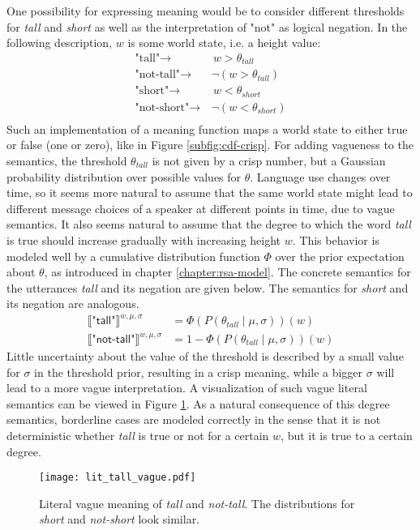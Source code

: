 One possibility for expressing meaning would be to consider different thresholds for \textit{tall} and \textit{short} as well as the interpretation of "not" as logical negation. In the following description, $w$ is some world state, i.e. a height value:
\begin{align*}
\text{"tall"} \rightarrow& \,\, w > \theta_{tall}\\ 
\text{"not-tall"} \rightarrow& \, \neg (w > \theta_{tall})\\
\text{"short"} \rightarrow& \,\, w < \theta_{short}\\
\text{"not-short"} \rightarrow& \, \neg (w < \theta_{short})\\
\end{align*}
Such an implementation of a meaning function maps a world state to either true or false (one or zero), like in Figure \ref{subfig:cdf-crisp}. For adding vagueness to the semantics, the threshold $\theta_{tall}$ is not given by a crisp number, but a Gaussian probability distribution over possible values for $\theta$. Language use changes over time, so it seems more natural to assume that the same world state might lead to different message choices of a speaker at different points in time, due to vague semantics. It also seems natural to assume that the degree to which the word \textit{tall} is true should increase gradually with increasing height $w$. This behavior is modeled well by a cumulative distribution function $\Phi$ over the prior expectation about $\theta$, as introduced in chapter \ref{chapter:rsa-model}. The concrete semantics for the utterances \textit{tall} and its negation are given below. The semantics for \textit{short} and its negation are analogous.
\begin{align*}
\llbracket \textsf{"tall"} \rrbracket^{w, \mu,\sigma} &= \Phi(P(\theta_{tall} \mid \mu, \sigma))(w)\\
\llbracket \textsf{"not-tall"}  \rrbracket^{w, \mu,\sigma} &= 1 - \Phi(P(\theta_{tall} \mid \mu, \sigma))(w)
\end{align*}
Little uncertainty about the value of the threshold is described by a small value for $\sigma$ in the threshold prior, resulting in a crisp meaning, while a bigger $\sigma$ will lead to a more vague interpretation. A visualization of such vague literal semantics can be viewed in Figure \ref{figure:litsemantics}.
As a natural consequence of this degree semantics, borderline cases are modeled correctly in the sense that it is not deterministic whether \textit{tall} is true or not for a certain $w$, but it is true to a certain degree.
\begin{figure}
 \centering
 \texttt{[image: lit\_tall\_vague.pdf]}
 \caption{Literal vague meaning of \textit{tall} and \textit{not-tall}. The distributions for \textit{short} and \textit{not-short} look similar.}
 \label{figure:litsemantics}
\end{figure}

